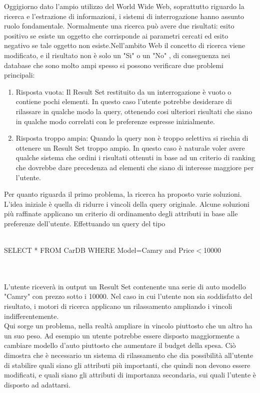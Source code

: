 Oggigiorno dato l'ampio utilizzo del World Wide Web, soprattutto riguardo la ricerca e l'estrazione di informazioni, i sistemi di interrogazione hanno assunto ruolo fondamentale.
Normalmente una ricerca può avere due risultati: esito positivo se esiste un oggetto che corrisponde ai parametri cercati ed esito negativo se tale oggetto non esiste.Nell'ambito Web il concetto di ricerca viene modificato, e il risultato non è solo un "Si" o un "No" , di conseguenza nei database che  sono molto ampi spesso si possono verificare due problemi principali:
\begin{enumerate}
    \item Risposta vuota: Il Result Set restituito da un interrogazione è vuoto o contiene pochi elementi. In questo caso l'utente potrebbe desiderare di rilassare in qualche modo la query, ottenendo cosi ulteriori risultati che siano in qualche modo correlati con le preferenze espresse inizialmente.
    \item Risposta troppo ampia: Quando la query non è troppo selettiva si rischia di ottenere un Result Set troppo ampio. In questo caso è naturale voler avere qualche sistema che ordini i risultati ottenuti in base ad un criterio di ranking che dovrebbe dare precedenza ad elementi che siano di  interesse maggiore per l'utente.
\end{enumerate}

Per quanto riguarda il primo problema, la ricerca ha proposto varie soluzioni. L'idea iniziale è quella di ridurre i vincoli della query originale. Alcune soluzioni più raffinate applicano un criterio di ordinamento degli attributi in base alle preferenze dell'utente. Effettuando un query del tipo
\\~\\
\centerline{SELECT * FROM CarDB WHERE Model=Camry and Price$<$10000}
\\~\\
L'utente riceverà in output un Result Set contenente una serie di auto modello "Camry" con prezzo sotto i 10000. Nel caso in cui l'utente non sia soddisfatto del risultato, i motori di ricerca applicano un rilassamento ampliando i vincoli indifferentemente. \\
Qui sorge un problema, nella realtà ampliare in vincolo piuttosto che un altro ha un suo peso. Ad esempio un utente potrebbe essere disposto maggiormente a cambiare modello d'auto piuttosto che aumentare il budget della spesa. Ciò dimostra che è necessario un sistema di rilassamento che dia possibilità all'utente di stabilire quali siano gli attributi più importanti, che quindi non devono essere modificati, e quali siano gli attributi di importanza secondaria, sui quali l'utente è disposto ad adattarsi. 
